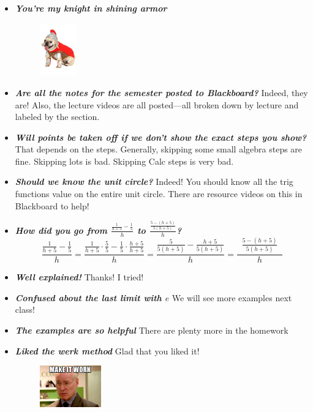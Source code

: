 \documentclass[11pt,letterpaper]{article}
\begin{document}
\begin{itemize}
\item {\bfseries\itshape You're my knight in shining armor} 
	\begin{figure}[H]
	\centering
	\includegraphics[width=0.15\textwidth]{images/pugcostume}
	\end{figure}

\item {\bfseries\itshape Are all the notes for the semester posted to Blackboard?} Indeed, they are! Also, the lecture videos are all posted---all broken down by lecture and labeled by the section.

\item {\bfseries\itshape Will points be taken off if we don't show the exact steps you show?} That depends on the steps. Generally, skipping some small algebra steps are fine. Skipping lots is bad. Skipping Calc steps is very bad. 

\item {\bfseries\itshape Should we know the unit circle?} Indeed! You should know all the trig functions value on the entire unit circle. There are resource videos on this in Blackboard to help!

\item {\bfseries\itshape How did you go from $\tfrac{\frac{1}{h + 5} - \frac{1}{5}}{h}$ to $\tfrac{\tfrac{5 - (h + 5)}{5(h + 5)}}{h}$?}
	\[
	\dfrac{\frac{1}{h + 5} - \frac{1}{5}}{h}= \dfrac{\frac{1}{h + 5} \cdot \frac{5}{5} - \frac{1}{5} \cdot \frac{h + 5}{h + 5}}{h}= \dfrac{\frac{5}{5(h + 5)} - \frac{h+5}{5(h + 5)}}{h}= \dfrac{\;\;\frac{5 - (h + 5)}{5(h + 5)}\;\;}{h}
	\]

\item {\bfseries\itshape Well explained!} Thanks! I tried!

\item {\bfseries\itshape Confused about the last limit with $e$} We will see more examples next class!

\item {\bfseries\itshape The examples are so helpful} There are plenty more in the homework \Winkey

\item {\bfseries\itshape Liked the werk method} Glad that you liked it!
	\begin{figure}[H]
	\centering
	\includegraphics[width=0.25\textwidth]{images/werk.jpeg}
	\end{figure}


\end{itemize}
\end{document}
